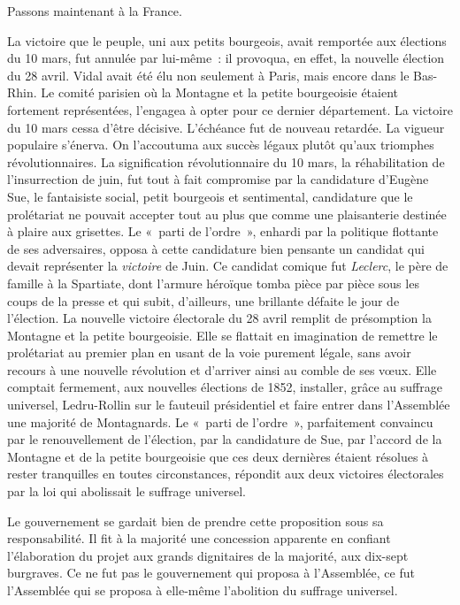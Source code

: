 \documentclass[french,twoside]{book} %
\begin{document}
Passons maintenant à la France.\par
La victoire que le peuple, uni aux petits bourgeois, avait remportée aux élections du 10 mars, fut annulée par lui-même : il provoqua, en effet, la nouvelle élection du 28 avril. Vidal avait été élu non seulement à Paris, mais encore dans le Bas-Rhin. Le comité parisien où la Montagne et la petite bourgeoisie étaient fortement représentées, l’engagea à opter pour ce dernier département. La victoire du 10 mars cessa d’être décisive. L’échéance fut de nouveau retardée. La vigueur populaire s’énerva. On l’accoutuma aux succès légaux plutôt qu’aux triomphes révolutionnaires. La signification révolutionnaire du 10 mars, la réhabilitation de l’insurrection de juin, fut tout à fait compromise par la candidature d’Eugène Sue, le fantaisiste social, petit bourgeois et sentimental, candidature que le prolétariat ne pouvait accepter tout au plus que comme une plaisanterie destinée à plaire aux grisettes. Le « parti de l’ordre », enhardi par la politique flottante de ses adversaires, opposa à cette candidature bien pensante un candidat qui devait représenter la \emph{victoire} de Juin. Ce candidat comique fut \emph{Leclerc}, le père de famille à la Spartiate, dont l’armure héroïque tomba pièce par pièce sous les coups de la presse et qui subit, d’ailleurs, une brillante défaite le jour de l’élection. La nouvelle victoire électorale du 28 avril remplit de présomption la Montagne et la petite bourgeoisie. Elle se flattait en imagination de remettre le prolétariat au premier plan en usant de la voie purement légale, sans avoir recours à une nouvelle révolution et d’arriver ainsi au comble de ses vœux. Elle comptait fermement, aux nouvelles élections de 1852, installer, grâce au suffrage universel, Ledru-Rollin sur le fauteuil présidentiel et faire entrer dans l’Assemblée une majorité de Montagnards. Le « parti de l’ordre », parfaitement convaincu par le renouvellement de l’élection, par la candidature de Sue, par l’accord de la Montagne et de la petite bourgeoisie que ces deux dernières étaient résolues à rester tranquilles en toutes circonstances, répondit aux deux victoires électorales par la loi qui abolissait le suffrage universel.\par
Le gouvernement se gardait bien de prendre cette proposition sous sa responsabilité. Il fit à la majorité une concession apparente en confiant l’élaboration du projet aux grands dignitaires de la majorité, aux dix-sept burgraves. Ce ne fut pas le gouvernement qui proposa à l’Assemblée, ce fut l’Assemblée qui se proposa à elle-même l’abolition du suffrage universel.\par
\end{document}

